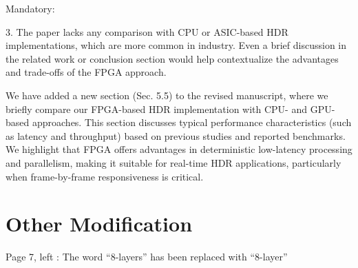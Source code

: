 \documentclass[a4j]{jsarticle}
\begin{document}
\vspace{0.3cm}
\begin{screen}
Mandatory:

3. The paper lacks any comparison with CPU or ASIC-based HDR implementations, which are more common in industry. Even a brief discussion in the related work or conclusion section would help contextualize the advantages and trade-offs of the FPGA approach.
\end{screen}
We have added a new section (Sec. 5.5) to the revised manuscript, 
where we briefly compare our FPGA-based HDR implementation 
with CPU- and GPU-based approaches.
This section discusses typical performance characteristics (such as latency and 
throughput) based on previous studies and reported benchmarks. 
We highlight that FPGA offers advantages in deterministic low-latency processing 
and parallelism, making it suitable for real-time HDR applications, 
particularly when frame-by-frame responsiveness is critical.


\section*{Other Modification}

Page 7, left : The word ``8-layers'' has been replaced with ``8-layer''
\end{document}
